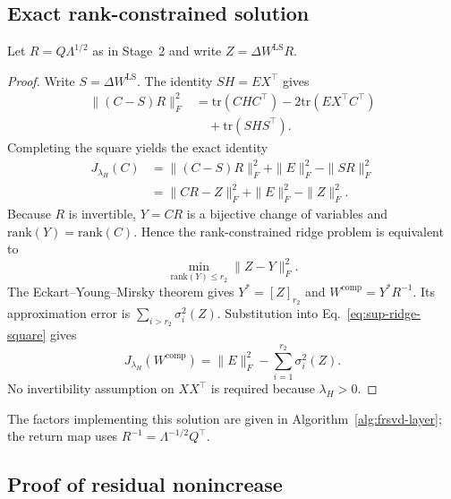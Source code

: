 \subsection{Exact rank-constrained solution}\label{sup:eigenspace-projection}

Let $R=Q\Lambda^{1/2}$ as in Stage~2 and write $Z=\Delta W^{\mathrm{LS}}R$.

\begin{proof}
Write $S=\Delta W^{\mathrm{LS}}$. The identity $SH=EX^\top$ gives
\begin{equation}
\begin{aligned}
\|(C-S)R\|_F^2
&=\mathrm{tr}(CHC^\top)-2\mathrm{tr}(EX^\top C^\top) \\
&\quad+\mathrm{tr}(SHS^\top).
\end{aligned}
\end{equation}
Completing the square yields the exact identity
\begin{equation}
\begin{aligned}
J_{\lambda_H}(C)
&=\|(C-S)R\|_F^2+\|E\|_F^2-\|SR\|_F^2 \\
&=\|CR-Z\|_F^2+\|E\|_F^2-\|Z\|_F^2.
\end{aligned}
\label{eq:sup-ridge-square}
\end{equation}
Because $R$ is invertible, $Y=CR$ is a bijective change of variables and $\mathrm{rank}(Y)=\mathrm{rank}(C)$. Hence the rank-constrained ridge problem is equivalent to
\begin{equation}
\min_{\mathrm{rank}(Y)\le r_2}\|Z-Y\|_F^2.
\end{equation}
The Eckart--Young--Mirsky theorem gives $Y^*=[Z]_{r_2}$ and $W^{\mathrm{comp}}=Y^*R^{-1}$. Its approximation error is $\sum_{i>r_2}\sigma_i^2(Z)$. Substitution into Eq.~\eqref{eq:sup-ridge-square} gives
\begin{equation}
J_{\lambda_H}(W^{\mathrm{comp}})
=\|E\|_F^2-\sum_{i=1}^{r_2}\sigma_i^2(Z).
\label{eq:ridge-optimum}
\end{equation}
No invertibility assumption on $XX^\top$ is required because $\lambda_H>0$.
\end{proof}

The factors implementing this solution are given in Algorithm~\ref{alg:frsvd-layer}; the return map uses $R^{-1}=\Lambda^{-1/2}Q^\top$.

\subsection{Proof of residual nonincrease}\label{sup:proof-lemma1}

